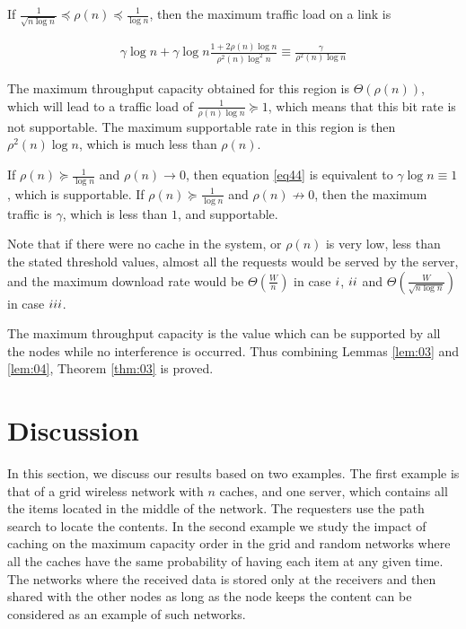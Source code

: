 \documentclass[journal]{IEEEtran}
\theoremstyle{plain}
\theoremstyle{remark}
\begin{document}
\begin{IEEEproof}
If $\frac{1}{\sqrt{n\log n}} \preceq \rho(n) \preceq \frac{1}{\log n}$, then the maximum traffic load on a link is 

\begin{eqnarray}
\gamma \log n + \gamma \log n \frac{1 + 2 \rho(n) \log n}{\rho^2(n) \log^2 n} \equiv \frac{\gamma}{\rho^2(n)\log n}
\end{eqnarray}

The maximum throughput capacity obtained for this region is $\Theta(\rho(n))$, which will lead to a traffic load of $\frac{1}{\rho(n) \log n} \succeq 1$, which means that this bit rate is not supportable. The maximum supportable rate in this region is then $\rho^2(n)\log n$, which is much less than $\rho(n)$.

If $\rho(n) \succeq \frac{1}{\log n}$ and $\rho(n) \rightarrow 0$, then equation \eqref{eq44}  is equivalent to $\gamma \log n \equiv 1$, which is supportable. If $\rho(n) \succeq \frac{1}{\log n}$ and $\rho(n) \nrightarrow 0$, then the maximum traffic is $\gamma$, which is less than $1$, and supportable.

Note that if there were no cache in the system, or $\rho(n)$ is very low, less than the stated threshold values, almost all the requests would be served by the server, and the maximum download rate would be $\Theta(\frac{W}{n})$ in case $\romannumeral 1$, $\romannumeral 2$ and $\Theta(\frac{W}{\sqrt{n\log n}})$ in case $\romannumeral 3$.

\end{IEEEproof}

The maximum throughput capacity is the value which can be supported by all the nodes while no interference is occurred. Thus combining Lemmas \ref{lem:03} and \ref{lem:04}, Theorem \ref{thm:03} is proved.

\section{Discussion}
\label{sec:discussion}

In this section, we discuss our results based on two examples. The first example is that of a grid wireless network with $n$ caches, and one server, which contains all the items located in the middle of the network. The requesters use the path search to locate the contents.  In the second example we study the impact of caching on the maximum capacity order in the grid and random networks where all the caches have the same probability of having each item at any given time. The networks where the received data is stored only at the receivers and then shared with the other nodes as long as the node keeps the content can be considered as an example of such networks. 
\end{document}
